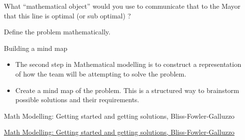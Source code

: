 \begin{parts}
	\item What ``mathematical object'' would you use to communicate that to the Mayor that this line is optimal (or sub optimal) ?

	\item Define the problem mathematically.
\end{parts}

















\standardonlynewpage


%
%



\begin{module}{Building a mind map}
	\label{mindmap}

	
	
\end{module}



\begin{lesson}

	\begin{itemize}
		\item The second step in Mathematical modelling is to construct a representation of how the team will be attempting to solve the problem.
		\item Create a mind map of the problem. This is a structured way to brainstorm possible solutions and their requirements.
	\end{itemize}
	

\begin{annotation}
	\begin{goals}
	Math Modelling: Getting started and getting solutions, Bliss-Fowler-Galluzzo
	
	\hfill {}	
	\end{goals}
\end{annotation}
	 \href{https://m3challenge.siam.org/resources/modeling-handbook}{Math Modelling: Getting started and getting solutions, Bliss-Fowler-Galluzzo}

\end{lesson}





